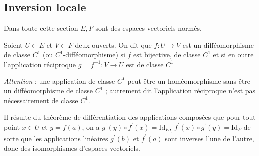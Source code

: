 %
%
%
\subsection{Inversion locale}
Dans toute cette section $E,F$ sont des espaces vectoriels normés.
\begin{fdefn}\label{def:diffeo}
Soient $U\subset E$ et $V \subset F$ deux ouverts. On dit que $f \colon U \to V$ est un difféomorphisme de classe $C^1$ (ou $C^1$-difféomorphisme) 
si $f$ est bijective, de classe $C^1$ et si en outre l'application réciproque $g=f^{-1} \colon V \to U$ est de classe $C^1$
\end{fdefn}

\emph{Attention} : une application de classe $C^1$ peut être un homéomorphisme sans être un difféomorphisme de classe $C^1$ ; autrement dit l'application réciproque n'est pas nécessairement de classe $C^1$.

Il résulte du théorème de différentiation des applications composées que pour tout point 
$x \in U$ et $y=f(a)$, on a $g^\prime(y) \circ f^\prime(x)= \text{Id}_E, _, f^\prime(x) \circ g^\prime(y) = \text{Id}_F$ de sorte que les applications linéaires $g^\prime(b)$ et $f^\prime(a)$ 
sont inverses l'une de l'autre, donc des isomorphismes d'espaces vectoriels. 


